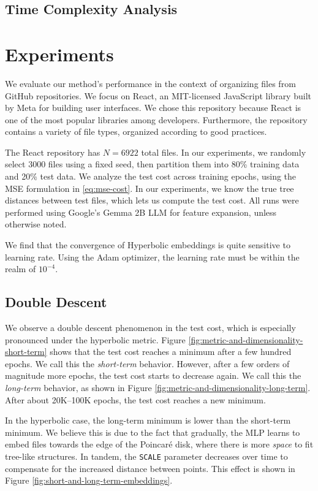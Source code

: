 \documentclass{article}
\begin{document}
\subsection{Time Complexity Analysis}

\section{Experiments}

We evaluate our method's performance in the context of organizing files from GitHub repositories. We focus on React, an MIT-licensed JavaScript library built by Meta for building user interfaces. We chose this repository because React is one of the most popular libraries among developers. Furthermore, the repository contains a variety of file types, organized according to good practices.

The React repository has $N=6922$ total files. In our experiments, we randomly select 3000 files using a fixed seed, then partition them into 80\% training data and 20\% test data. We analyze the test cost across training epochs, using the MSE formulation in \eqref{eq:mse-cost}. In our experiments, we know the true tree distances between test files, which lets us compute the test cost. All runs were performed using Google's Gemma 2B LLM for feature expansion, unless otherwise noted.

We find that the convergence of Hyperbolic embeddings is quite sensitive to learning rate. Using the Adam optimizer, the learning rate must be within the realm of $10^{-4}$.

\subsection{Double Descent}

We observe a double descent phenomenon in the test cost, which is especially pronounced under the hyperbolic metric. Figure \ref{fig:metric-and-dimensionality-short-term} shows that the test cost reaches a minimum after a few hundred epochs. We call this the \emph{short-term} behavior. However, after a few orders of magnitude more epochs, the test cost starts to decrease again. We call this the \emph{long-term} behavior, as shown in Figure \ref{fig:metric-and-dimensionality-long-term}. After about 20K--100K epochs, the test cost reaches a new minimum.

In the hyperbolic case, the long-term minimum is lower than the short-term minimum. We believe this is due to the fact that gradually, the MLP learns to embed files towards the edge of the Poincaré disk, where there is more \emph{space} to fit tree-like structures. In tandem, the \texttt{SCALE} parameter decreases over time to compensate for the increased distance between points. This effect is shown in Figure \ref{fig:short-and-long-term-embeddings}.
\end{document}
